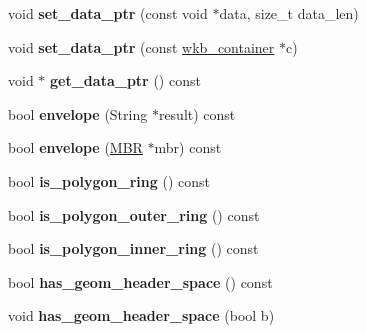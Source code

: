 \begin{DoxyCompactItemize}
\item 
\mbox{\label{classGeometry_aed18120a4ddb4d7e93d6a2cb13c88309}} 
void {\bfseries set\+\_\+data\+\_\+ptr} (const void $\ast$data, size\+\_\+t data\+\_\+len)
\item 
\mbox{\label{classGeometry_addc4d7dba211dcc9daeb1fb213f699c9}} 
void {\bfseries set\+\_\+data\+\_\+ptr} (const \mbox{\hyperlink{classGeometry_1_1wkb__container}{wkb\+\_\+container}} $\ast$c)
\item 
\mbox{\label{classGeometry_a37417599e497d40d5542a455f5d1f1ee}} 
void $\ast$ {\bfseries get\+\_\+data\+\_\+ptr} () const
\item 
\mbox{\label{classGeometry_a958af96df1059ceae38166dabcc3e4cf}} 
bool {\bfseries envelope} (String $\ast$result) const
\item 
\mbox{\label{classGeometry_af38a97eecbce037fa05c77c6d7d18ee5}} 
bool {\bfseries envelope} (\mbox{\hyperlink{structMBR}{M\+BR}} $\ast$mbr) const
\item 
\mbox{\label{classGeometry_aa2744a2f5972b286f2b605eab44532f9}} 
bool {\bfseries is\+\_\+polygon\+\_\+ring} () const
\item 
\mbox{\label{classGeometry_ad1cfcc5c0e48abbd625c22e2cda7f0d1}} 
bool {\bfseries is\+\_\+polygon\+\_\+outer\+\_\+ring} () const
\item 
\mbox{\label{classGeometry_aa3fb7c8ad4939d3b454b2c65000dd1e9}} 
bool {\bfseries is\+\_\+polygon\+\_\+inner\+\_\+ring} () const
\item 
\mbox{\label{classGeometry_a9958437de81dcec10d0011537a06eaf1}} 
bool {\bfseries has\+\_\+geom\+\_\+header\+\_\+space} () const
\item 
\mbox{\label{classGeometry_ad152ca0dce645d6d80526b3bce2d53f7}} 
void {\bfseries has\+\_\+geom\+\_\+header\+\_\+space} (bool b)
\item 
\mbox{\label{classGeometry_a298dbc47085a4248cd34432ea710ffb4}} 

\end{DoxyCompactItemize}
